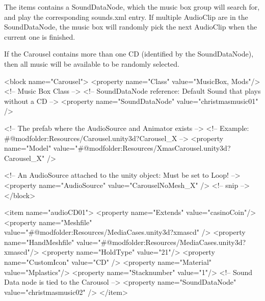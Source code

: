 The item\textquotesingle{}s contains a Sound\+Data\+Node, which the music box group will search for, and play the corresponding sounds.\+xml entry. If multiple Audio\+Clip are in the Sound\+Data\+Node, the music box will randomly pick the next Audio\+Clip when the current one is finished.

If the Carousel contains more than one CD (identified by the Sound\+Data\+Node), then all music will be available to be randomly selected. \begin{DoxyVerb}<block name="Carousel">
    <property name="Class" value="MusicBox, Mods"/> <!-- Music Box Class -->
    <!-- SoundDataNode reference: Default Sound that plays without a CD -->
    <property name="SoundDataNode" value="christmasmusic01" />

    <!-- The prefab where the AudioSource and Animator exists -->
    <!-- Example: #@modfolder:Resources/Carousel.unity3d?Carousel_X -->
    <property name="Model" value="#@modfolder:Resources/XmasCarousel.unity3d?Carousel_X" />

    <!-- An AudioSource attached to the unity object: Must be set to Loop! -->
    <property name="AudioSource" value="CarouselNoMesh_X" />
    <!-- snip -->
</block>  

<item name="audioCD01">
    <property name="Extends" value="casinoCoin"/>
    <property name="Meshfile" value="#@modfolder:Resources/MediaCases.unity3d?xmascd" /> 
    <property name="HandMeshfile" value="#@modfolder:Resources/MediaCases.unity3d?xmascd"/> 
    <property name="HoldType" value="21"/> 
    <property name="CustomIcon" value="CD" />
    <property name="Material" value="Mplastics"/>
    <property name="Stacknumber" value="1"/>
    <!-- Sound Data node is tied to the Carousol -->
    <property name="SoundDataNode" value="christmasmusic02" />
</item>


\end{DoxyVerb}
